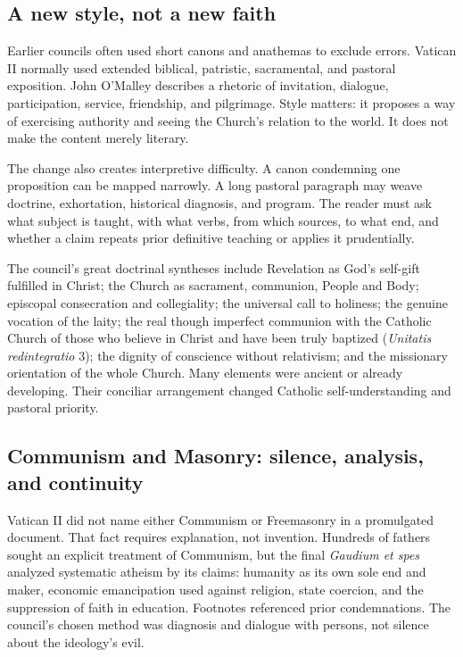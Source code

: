 \subsection{A new style, not a new faith}

Earlier councils often used short canons and anathemas to exclude errors. Vatican II normally used extended biblical, patristic, sacramental, and pastoral exposition. John O'Malley describes a rhetoric of invitation, dialogue, participation, service, friendship, and pilgrimage. Style matters: it proposes a way of exercising authority and seeing the Church's relation to the world. It does not make the content merely literary.

The change also creates interpretive difficulty. A canon condemning one proposition can be mapped narrowly. A long pastoral paragraph may weave doctrine, exhortation, historical diagnosis, and program. The reader must ask what subject is taught, with what verbs, from which sources, to what end, and whether a claim repeats prior definitive teaching or applies it prudentially.

The council's great doctrinal syntheses include Revelation as God's self-gift fulfilled in Christ; the Church as sacrament, communion, People and Body; episcopal consecration and collegiality; the universal call to holiness; the genuine vocation of the laity; the real though imperfect communion with the Catholic Church of those who believe in Christ and have been truly baptized (\emph{Unitatis redintegratio} 3); the dignity of conscience without relativism; and the missionary orientation of the whole Church. Many elements were ancient or already developing. Their conciliar arrangement changed Catholic self-understanding and pastoral priority.

\subsection{Communism and Masonry: silence, analysis, and continuity}

Vatican II did not name either Communism or Freemasonry in a promulgated document. That fact requires explanation, not invention. Hundreds of fathers sought an explicit treatment of Communism, but the final \emph{Gaudium et spes} analyzed systematic atheism by its claims: humanity as its own sole end and maker, economic emancipation used against religion, state coercion, and the suppression of faith in education. Footnotes referenced prior condemnations. The council's chosen method was diagnosis and dialogue with persons, not silence about the ideology's evil.

